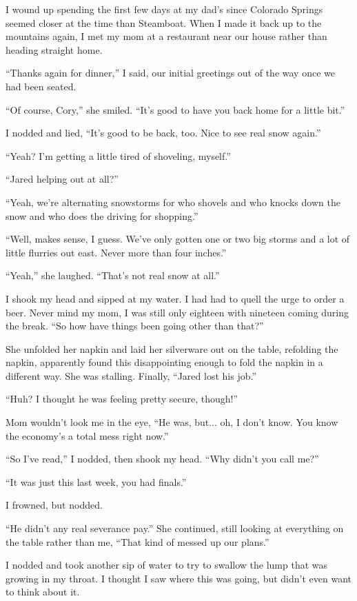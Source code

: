 I wound up spending the first few days at my dad's since Colorado Springs seemed closer at the time than Steamboat.  When I made it back up to the mountains again, I met my mom at a restaurant near our house rather than heading straight home.

``Thanks again for dinner,'' I said, our initial greetings out of the way once we had been seated.

``Of course, Cory,'' she smiled.  ``It's good to have you back home for a little bit.''

I nodded and lied, ``It's good to be back, too.  Nice to see real snow again.''

``Yeah?  I'm getting a little tired of shoveling, myself.''

``Jared helping out at all?''

``Yeah, we're alternating snowstorms for who shovels and who knocks down the snow and who does the driving for shopping.''

``Well, makes sense, I guess.  We've only gotten one or two big storms and a lot of little flurries out east.  Never more than four inches.''

``Yeah,'' she laughed.  ``That's not real snow at all.''

I shook my head and sipped at my water.  I had had to quell the urge to order a beer.  Never mind my mom, I was still only eighteen with nineteen coming during the break.  ``So how have things been going other than that?''

She unfolded her napkin and laid her silverware out on the table, refolding the napkin, apparently found this disappointing enough to fold the napkin in a different way.  She was stalling.  Finally, ``Jared lost his job.''

``Huh?  I thought he was feeling pretty secure, though!''


Mom wouldn't look me in the eye, ``He was, but... oh, I don't know.  You know the economy's a total mess right now.''

``So I've read,'' I nodded, then shook my head.  ``Why didn't you call me?''

``It was just this last week, you had finals.''

I frowned, but nodded.

``He didn't any real severance pay.''  She continued, still looking at everything on the table rather than me, ``That kind of messed up our plans.''

I nodded and took another sip of water to try to swallow the lump that was growing in my throat.  I thought I saw where this was going, but didn't even want to think about it.


